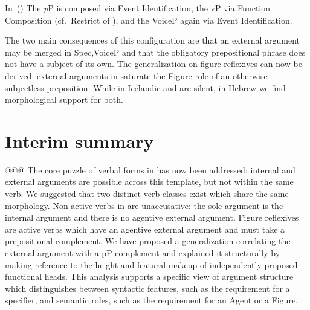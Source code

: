 In~(\lastx) The \emph{p}P is composed via Event Identification, the vP via Function Composition (cf.~Restrict of \citealt{chungladusaw04}), and the VoiceP again via Event Identification.


The two main consequences of this configuration are that an external argument may be merged in Spec,VoiceP and that the obligatory prepositional phrase does not have a subject of its own. The generalization on figure reflexives can now be derived: external arguments in {\tnif} saturate the Figure role of an otherwise subjectless preposition. While in Icelandic {\vz} and {\pz} are silent, in Hebrew we find morphological support for both.


	\section{Interim summary} \label{vz:intersum}
@@@
The core puzzle of verbal forms in {\tnif} has now been addressed: internal and external arguments are possible across this template, but not within the same verb. We suggested that two distinct verb classes exist which share the same morphology. Non-active verbs in {\tnif} are unaccusative: the sole argument is the internal argument and there is no agentive external argument. Figure reflexives are active verbs which have an agentive external argument and must take a prepositional complement. We have proposed a generalization correlating the external argument with a pP complement and explained it structurally by making reference to the height and featural makeup of independently proposed functional heads. This analysis supports a specific view of argument structure which distinguishes between syntactic features, such as the requirement for a specifier, and semantic roles, such as the requirement for an Agent or a Figure.

